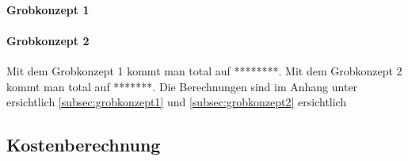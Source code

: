 \bigskip

\paragraph{Grobkonzept 1} 



\paragraph{Grobkonzept 2}

Mit dem Grobkonzept 1 kommt man total auf ********. Mit dem Grobkonzept 2 kommt man total auf *******. Die Berechnungen sind im Anhang unter  ersichtlich \ref{subsec:grobkonzept1}  und \ref{subsec:grobkonzept2}  ersichtlich




\subsection{Kostenberechnung} \label{subsec:kostenberechnung}